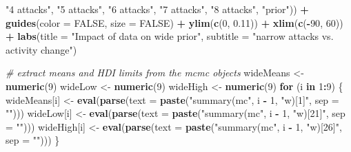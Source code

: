 \documentclass[10pt,]{scrartcl}
\newenvironment{Shaded}{\begin{snugshade}}{\end{snugshade}}
\newcommand{\KeywordTok}[1]{\textcolor[rgb]{0.13,0.29,0.53}{\textbf{#1}}}
\newcommand{\DataTypeTok}[1]{\textcolor[rgb]{0.13,0.29,0.53}{#1}}
\newcommand{\DecValTok}[1]{\textcolor[rgb]{0.00,0.00,0.81}{#1}}
\newcommand{\FloatTok}[1]{\textcolor[rgb]{0.00,0.00,0.81}{#1}}
\newcommand{\StringTok}[1]{\textcolor[rgb]{0.31,0.60,0.02}{#1}}
\newcommand{\CommentTok}[1]{\textcolor[rgb]{0.56,0.35,0.01}{\textit{#1}}}
\newcommand{\OtherTok}[1]{\textcolor[rgb]{0.56,0.35,0.01}{#1}}
\newcommand{\ControlFlowTok}[1]{\textcolor[rgb]{0.13,0.29,0.53}{\textbf{#1}}}
\newcommand{\OperatorTok}[1]{\textcolor[rgb]{0.81,0.36,0.00}{\textbf{#1}}}
\newcommand{\NormalTok}[1]{#1}
\begin{document}
\begin{Shaded}
\begin{Highlighting}[]
        \StringTok{"4 attacks"}\NormalTok{, }\StringTok{"5 attacks"}\NormalTok{, }\StringTok{"6 attacks"}\NormalTok{, }\StringTok{"7 attacks"}\NormalTok{, }\StringTok{"8 attacks"}\NormalTok{,}
        \StringTok{"prior"}\NormalTok{)) }\OperatorTok{+}\StringTok{ }\KeywordTok{guides}\NormalTok{(}\DataTypeTok{color =} \OtherTok{FALSE}\NormalTok{, }\DataTypeTok{size =} \OtherTok{FALSE}\NormalTok{) }\OperatorTok{+}\StringTok{ }\KeywordTok{ylim}\NormalTok{(}\KeywordTok{c}\NormalTok{(}\DecValTok{0}\NormalTok{,}
    \FloatTok{0.11}\NormalTok{)) }\OperatorTok{+}\StringTok{ }\KeywordTok{xlim}\NormalTok{(}\KeywordTok{c}\NormalTok{(}\OperatorTok{-}\DecValTok{90}\NormalTok{, }\DecValTok{60}\NormalTok{)) }\OperatorTok{+}\StringTok{ }\KeywordTok{labs}\NormalTok{(}\DataTypeTok{title =} \StringTok{"Impact of data on wide prior"}\NormalTok{,}
    \DataTypeTok{subtitle =} \StringTok{"narrow attacks vs. activity change"}\NormalTok{)}

\CommentTok{# extract means and HDI limits from the mcmc objects}
\NormalTok{wideMeans <-}\StringTok{ }\KeywordTok{numeric}\NormalTok{(}\DecValTok{9}\NormalTok{)}
\NormalTok{wideLow <-}\StringTok{ }\KeywordTok{numeric}\NormalTok{(}\DecValTok{9}\NormalTok{)}
\NormalTok{wideHigh <-}\StringTok{ }\KeywordTok{numeric}\NormalTok{(}\DecValTok{9}\NormalTok{)}
\ControlFlowTok{for}\NormalTok{ (i }\ControlFlowTok{in} \DecValTok{1}\OperatorTok{:}\DecValTok{9}\NormalTok{) \{}
\NormalTok{    wideMeans[i] <-}\StringTok{ }\KeywordTok{eval}\NormalTok{(}\KeywordTok{parse}\NormalTok{(}\DataTypeTok{text =} \KeywordTok{paste}\NormalTok{(}\StringTok{"summary(mc"}\NormalTok{, i }\OperatorTok{-}
\StringTok{        }\DecValTok{1}\NormalTok{, }\StringTok{"w)[1]"}\NormalTok{, }\DataTypeTok{sep =} \StringTok{""}\NormalTok{)))}
\NormalTok{    wideLow[i] <-}\StringTok{ }\KeywordTok{eval}\NormalTok{(}\KeywordTok{parse}\NormalTok{(}\DataTypeTok{text =} \KeywordTok{paste}\NormalTok{(}\StringTok{"summary(mc"}\NormalTok{, i }\OperatorTok{-}\StringTok{ }\DecValTok{1}\NormalTok{,}
        \StringTok{"w)[21]"}\NormalTok{, }\DataTypeTok{sep =} \StringTok{""}\NormalTok{)))}
\NormalTok{    wideHigh[i] <-}\StringTok{ }\KeywordTok{eval}\NormalTok{(}\KeywordTok{parse}\NormalTok{(}\DataTypeTok{text =} \KeywordTok{paste}\NormalTok{(}\StringTok{"summary(mc"}\NormalTok{, i }\OperatorTok{-}
\StringTok{        }\DecValTok{1}\NormalTok{, }\StringTok{"w)[26]"}\NormalTok{, }\DataTypeTok{sep =} \StringTok{""}\NormalTok{)))}
\NormalTok{\}}


\end{Highlighting}
\end{Shaded}
\end{document}

